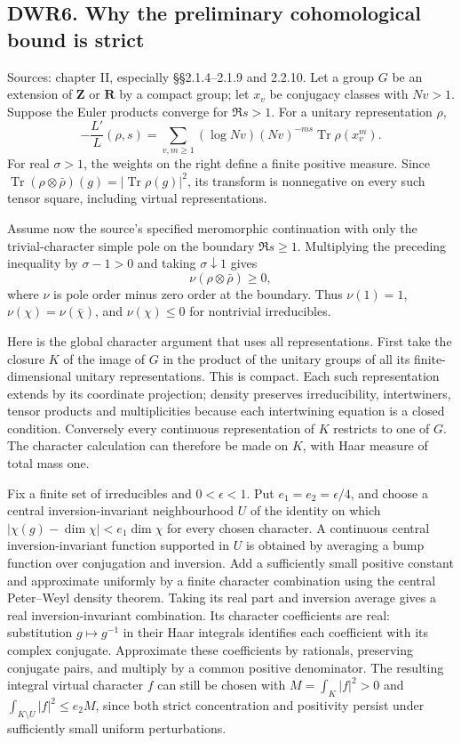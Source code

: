 \subsection{DWR6. Why the preliminary cohomological bound is
strict}\label{dwr6.-why-the-preliminary-cohomological-bound-is-strict}

Sources: chapter II, especially §§2.1.4--2.1.9 and 2.2.10. Let a group
\(G\) be an extension of \(\mathbf Z\) or \(\mathbf R\) by a compact
group; let \(x_v\) be conjugacy classes with \(Nv>1\). Suppose the Euler
products converge for \(\Re s>1\). For a unitary representation
\(\rho\), \[
-\frac{L'}{L}(\rho,s)
=\sum_{v,m\ge1}(\log Nv)(Nv)^{-ms}\operatorname{Tr}\rho(x_v^m).
\tag{DWR6.1}
\] For real \(\sigma>1\), the weights on the right define a finite
positive measure. Since
\(\operatorname{Tr}(\rho\otimes\bar\rho)(g)=|\operatorname{Tr}\rho(g)|^2\),
its transform is nonnegative on every such tensor square, including
virtual representations.

Assume now the source's specified meromorphic continuation with only the
trivial-character simple pole on the boundary \(\Re s\ge1\). Multiplying
the preceding inequality by \(\sigma-1>0\) and taking
\(\sigma\downarrow1\) gives \[
\nu(\rho\otimes\bar\rho)\ge0,
\tag{DWR6.2}
\] where \(\nu\) is pole order minus zero order at the boundary. Thus
\(\nu(1)=1\), \(\nu(\chi)=\nu(\bar\chi)\), and \(\nu(\chi)\le0\) for
nontrivial irreducibles.

Here is the global character argument that uses all representations.
First take the closure \(K\) of the image of \(G\) in the product of the
unitary groups of all its finite-dimensional unitary representations.
This is compact. Each such representation extends by its coordinate
projection; density preserves irreducibility, intertwiners, tensor
products and multiplicities because each intertwining equation is a
closed condition. Conversely every continuous representation of \(K\)
restricts to one of \(G\). The character calculation can therefore be
made on \(K\), with Haar measure of total mass one.

Fix a finite set of irreducibles and \(0<\epsilon<1\). Put
\(e_1=e_2=\epsilon/4\), and choose a central inversion-invariant
neighbourhood \(U\) of the identity on which
\(|\chi(g)-\dim\chi|<e_1\dim\chi\) for every chosen character. A
continuous central inversion-invariant function supported in \(U\) is
obtained by averaging a bump function over conjugation and inversion.
Add a sufficiently small positive constant and approximate uniformly by
a finite character combination using the central Peter--Weyl density
theorem. Taking its real part and inversion average gives a real
inversion-invariant combination. Its character coefficients are real:
substitution \(g\mapsto g^{-1}\) in their Haar integrals identifies each
coefficient with its complex conjugate. Approximate these coefficients
by rationals, preserving conjugate pairs, and multiply by a common
positive denominator. The resulting integral virtual character \(f\) can
still be chosen with \(M=\int_K|f|^2>0\) and
\(\int_{K\setminus U}|f|^2\le e_2M\), since both strict concentration
and positivity persist under sufficiently small uniform perturbations.

